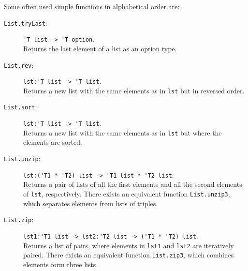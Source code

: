 \documentclass[fsharpNotes.tex]{subfiles}
\begin{document}
Some often used simple functions in alphabetical order are:
\begin{description}
\item[\texttt{List.tryLast}:]  \lstinline{'T list -> 'T option}.~\\
  Returns the last element of a list as an option type.
\item[\texttt{List.rev}:] \lstinline{lst:'T list -> 'T list}.~\\
  Returns a new list with the same elements as in \lstinline{lst} but in reversed order.
\item[\texttt{List.sort}:] \lstinline{lst:'T list -> 'T list}.~\\
  Returns a new list with the same elements as in \lstinline{lst} but where the elements are sorted.
\item[\texttt{List.unzip}:] \lstinline{lst:('T1 * 'T2) list -> 'T1 list * 'T2 list}.~\\
  Returns a pair of lists of all the first elements and all the second elements of \lstinline{lst}, respectively.
  There exists an equivalent function \lstinline{List.unzip3}, which separates elements from lists of triples.
\item[\texttt{List.zip}:] \lstinline{lst1:'T1 list -> lst2:'T2 list -> ('T1 * 'T2) list}.~\\
  Returns a list of pairs, where elements in \lstinline{lst1} and \lstinline{lst2} are iteratively paired.
  There exists an equivalent function \lstinline{List.zip3}, which combines elements form three lists.
\end{description}
\end{document}
